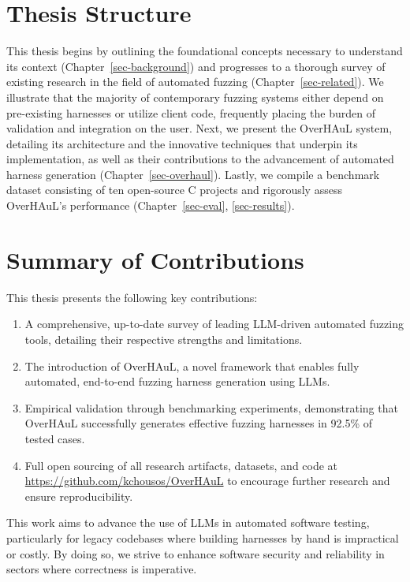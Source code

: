 \documentclass[
  a4paper,
]{scrreprt}
\providecommand{\tightlist}{%
  \setlength{\itemsep}{0pt}\setlength{\parskip}{0pt}}
\theoremstyle{definition}
\theoremstyle{remark}
\begin{document}
\section{Thesis Structure}\label{thesis-structure}

This thesis begins by outlining the foundational concepts necessary to
understand its context (Chapter~\ref{sec-background}) and progresses to
a thorough survey of existing research in the field of automated fuzzing
(Chapter~\ref{sec-related}). We illustrate that the majority of
contemporary fuzzing systems either depend on pre-existing harnesses or
utilize client code, frequently placing the burden of validation and
integration on the user. Next, we present the OverHAuL system, detailing
its architecture and the innovative techniques that underpin its
implementation, as well as their contributions to the advancement of
automated harness generation (Chapter~\ref{sec-overhaul}). Lastly, we
compile a benchmark dataset consisting of ten open-source C projects and
rigorously assess OverHAuL's performance
(Chapter~\ref{sec-eval}, \ref{sec-results}).

\section{Summary of Contributions}\label{summary-of-contributions}

This thesis presents the following key contributions:

\begin{enumerate}
\def\labelenumi{\arabic{enumi}.}
\tightlist
\item
  A comprehensive, up-to-date survey of leading LLM-driven automated
  fuzzing tools, detailing their respective strengths and limitations.
\item
  The introduction of OverHAuL, a novel framework that enables fully
  automated, end-to-end fuzzing harness generation using LLMs.
\item
  Empirical validation through benchmarking experiments, demonstrating
  that OverHAuL successfully generates effective fuzzing harnesses in
  92.5\% of tested cases.
\item
  Full open sourcing of all research artifacts, datasets, and code at
  \url{https://github.com/kchousos/OverHAuL} to encourage further
  research and ensure reproducibility.
\end{enumerate}

This work aims to advance the use of LLMs in automated software testing,
particularly for legacy codebases where building harnesses by hand is
impractical or costly. By doing so, we strive to enhance software
security and reliability in sectors where correctness is imperative.
\end{document}
